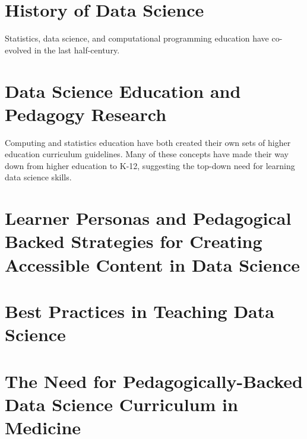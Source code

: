 \documentclass[../main.tex]{subfiles}
\begin{document}
    

    \section{History of Data Science}
        \label{se:intro-ds-history}

        Statistics, data science, and computational programming education
        have co-evolved in the last half-century.

        
        
        
        
        

    \section{Data Science Education and Pedagogy Research}
        \label{se:intro-ds-edu-ped}

        Computing and statistics education have both created their own sets of
        higher education curriculum guidelines.
        Many of these concepts have made their way down from higher education to K-12,
        suggesting the top-down need for learning data science skills.

        
        
        

    \section{Learner Personas and Pedagogical Backed Strategies for Creating Accessible Content in Data Science}
        \label{se:intro-personas}

        

    \section{Best Practices in Teaching Data Science}
        \label{se:intro-teaching-best-practices-ds}

        

    \section{The Need for Pedagogically-Backed Data Science Curriculum in Medicine}
        \label{se:intro-ds-edu-gaps}
        
\end{document}
